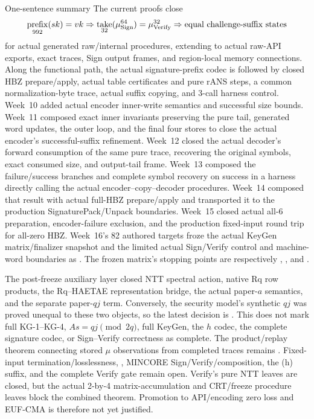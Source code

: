 \documentclass[11pt,a4paper]{article}
\begin{document}
\begin{takeaway}{One-sentence summary}
The current proofs close
\[
  \mathop{\mathrm{prefix}}_{992}(sk)=vk
  \Rightarrow
  \mathop{\mathrm{take}}_{32}(\mu_{\mathrm{Sign}}^{64})=\mu_{\mathrm{Verify}}^{32}
  \Rightarrow
  \text{equal challenge-suffix states}
\]
for actual generated raw/internal procedures, extending to actual raw-API
exports, exact traces, Sign output frames, and region-local memory connections.
Along the functional path, the actual signature-prefix codec is followed by
closed HBZ prepare/apply, actual table certificates and pure rANS steps, a
common normalization-byte trace, actual suffix copying, and 3-call harness
control. Week~10 added actual encoder inner-write semantics and successful size
bounds. Week~11 composed exact inner invariants preserving the pure tail,
generated word updates, the outer loop, and the final four stores to close the
actual encoder's successful-suffix refinement. Week~12 closed the actual
decoder's forward consumption of the same pure trace, recovering the original
symbols, exact consumed size, and output-tail frame. Week~13 composed the
failure/success branches and complete symbol recovery on success in a harness
directly calling the actual encoder--copy--decoder procedures. Week~14 composed
that result with actual full-HBZ prepare/apply and transported it to the
production SignaturePack/Unpack boundaries. Week~15 closed actual all-6
preparation, encoder-failure exclusion, and the production fixed-input round
trip for all-zero HBZ. Week~16's 82 authored targets froze the actual KeyGen
matrix/finalizer snapshot and the limited actual Sign/Verify control and
machine-word boundaries as . The frozen matrix's
stopping points are respectively ,
, and .

The post-freeze auxiliary layer closed NTT spectral action, native Rq row
products, the Rq--HAETAE representation bridge, the actual 
paper-\(a\) semantics, and the separate paper-\(qj\) term. Conversely, the
security model's synthetic \(qj\) was proved unequal to these two objects, so
the latest decision is . This does not mark full
KG-1--KG-4, \(As=qj\pmod{2q}\), full KeyGen, the \(h\) codec, the complete
signature codec, or Sign--Verify correctness as complete.
The product/replay theorem connecting stored \(\mu\) observations from completed
traces remains \statusdeferred. Fixed-input termination/losslessness,
, MINCORE Sign/Verify/composition,
the (h) suffix, and the complete Verify gate remain open. Verify's pure NTT
leaves are closed, but the actual 2-by-4 matrix-accumulation and CRT/freeze
procedure leaves block the combined theorem. Promotion to API/encoding zero
loss and EUF-CMA is therefore not yet justified.
\end{takeaway}
\end{document}
